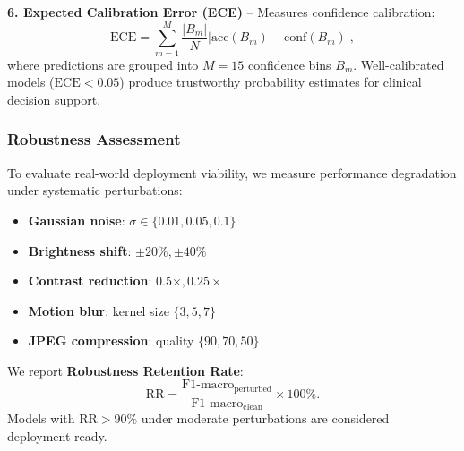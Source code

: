 \textbf{6. Expected Calibration Error (ECE)} -- Measures confidence calibration:
\begin{equation}
\text{ECE} = \sum_{m=1}^{M} \frac{|B_m|}{N} |\text{acc}(B_m) - \text{conf}(B_m)|,
\end{equation}
where predictions are grouped into $M=15$ confidence bins $B_m$. Well-calibrated models ($\text{ECE} < 0.05$) produce trustworthy probability estimates for clinical decision support.

\subsubsection{Robustness Assessment}

To evaluate real-world deployment viability, we measure performance degradation under systematic perturbations:
\begin{itemize}
    \item \textbf{Gaussian noise}: $\sigma \in \{0.01, 0.05, 0.1\}$
    \item \textbf{Brightness shift}: $\pm 20\%, \pm 40\%$
    \item \textbf{Contrast reduction}: $0.5\times, 0.25\times$
    \item \textbf{Motion blur}: kernel size $\{3, 5, 7\}$
    \item \textbf{JPEG compression}: quality $\{90, 70, 50\}$
\end{itemize}

We report \textbf{Robustness Retention Rate}:
\begin{equation}
\text{RR} = \frac{\text{F1-macro}_{\text{perturbed}}}{\text{F1-macro}_{\text{clean}}} \times 100\%.
\end{equation}
Models with $\text{RR} > 90\%$ under moderate perturbations are considered deployment-ready.

